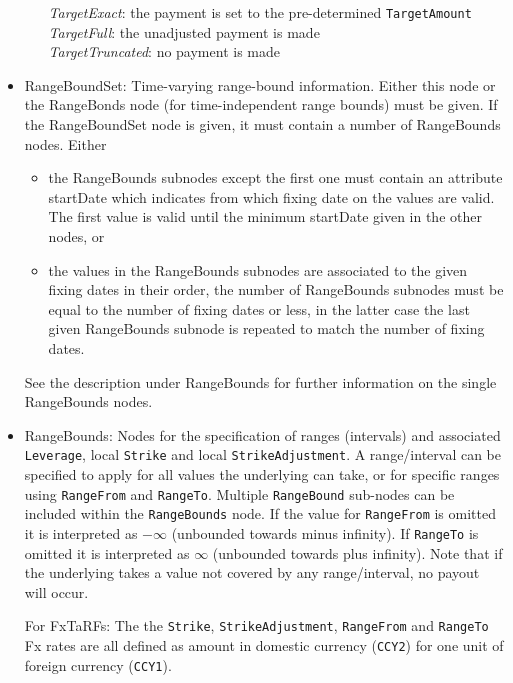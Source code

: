 \begin{itemize}
\begin{itemize}
     \emph{TargetExact}: the payment is set to the pre-determined \lstinline!TargetAmount!\\
     \emph{TargetFull}: the unadjusted payment is made\\
     \emph{TargetTruncated}: no payment is made
\end{itemize}

    \item RangeBoundSet: Time-varying range-bound information. Either this node or the RangeBonds node (for time-independent range bounds) must be given. If the RangeBoundSet node is given, it must contain a number of RangeBounds nodes. Either
     \begin{itemize}
       \item the RangeBounds subnodes except the first one must contain an attribute startDate which indicates from
         which fixing date on the values are valid. The first value is valid until the minimum startDate given in the
         other nodes, or
       \item the values in the RangeBounds subnodes are associated to the given fixing dates in their order, the number
         of RangeBounds subnodes must be equal to the number of fixing dates or less, in the latter case the last given
         RangeBounds subnode is repeated to match the number of fixing dates.
     \end{itemize}
     See the description under RangeBounds for further information on the single RangeBounds nodes.

    \item RangeBounds: Nodes for the specification of ranges (intervals) and associated \lstinline!Leverage!, local
      \lstinline!Strike! and local \lstinline!StrikeAdjustment!. A range/interval can be specified to apply for all
      values the underlying can take, or for specific ranges using \lstinline!RangeFrom! and
      \lstinline!RangeTo!. Multiple \lstinline!RangeBound! sub-nodes can be included within the \lstinline!RangeBounds!
      node. If the value for \lstinline!RangeFrom! is omitted it is interpreted as $-\infty$ (unbounded towards minus
      infinity). If \lstinline!RangeTo! is omitted it is interpreted as $\infty$ (unbounded towards plus infinity).
      Note that if the underlying takes a value not covered by any range/interval, no payout will occur.
    
    For FxTaRFs: The the  \lstinline!Strike!, \lstinline!StrikeAdjustment!, \lstinline!RangeFrom! and \lstinline!RangeTo! Fx rates are all defined as amount in domestic
currency (\lstinline!CCY2!) for one unit of foreign currency (\lstinline!CCY1!).
    

\end{itemize}
